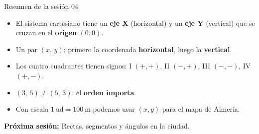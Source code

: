 \documentclass[aspectratio=169, 10pt, spanish]{beamer}
\begin{document}
\begin{frame}{Resumen de la sesión 04}
  \begin{resumenbox}
    \begin{itemize}
      \item El sistema cartesiano tiene un \textbf{eje X}
            (horizontal) y un \textbf{eje Y} (vertical)
            que se cruzan en el \textbf{origen} $(0,0)$.
      \item Un par $(x,\,y)$: primero la coordenada
            \textbf{horizontal}, luego la \textbf{vertical}.
      \item Los cuatro cuadrantes tienen signos:
            I $(+,+)$, II $(-,+)$, III $(-,-)$, IV $(+,-)$.
      \item $(3,\,5) \neq (5,\,3)$:
            el \textbf{orden importa}.
      \item Con escala $1\ \text{ud} = 100\ \text{m}$
            podemos usar $(x,y)$ para el mapa de Almería.
    \end{itemize}
  \end{resumenbox}
  \vspace{6pt}
  \begin{center}
    {\AlmFontSmall\color{AlmAzulM}
    \faArrowCircleRight\enskip
    \textbf{Próxima sesión:}
    Rectas, segmentos y ángulos en la ciudad.}
  \end{center}
\end{frame}
\end{document}
